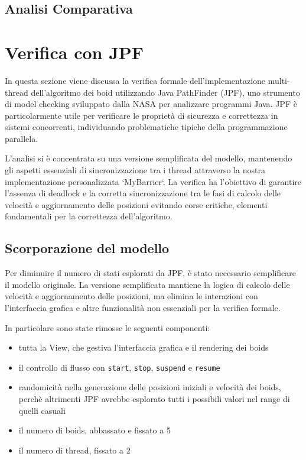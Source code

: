 \documentclass[a4paper,12pt]{report}
\begin{document}
\section{Analisi Comparativa}


\chapter{Verifica con JPF}
In questa sezione viene discussa la verifica formale dell'implementazione multi-thread dell'algoritmo dei boid utilizzando Java PathFinder (JPF), uno strumento di model checking sviluppato dalla NASA per analizzare programmi Java. 
JPF è particolarmente utile per verificare le proprietà di sicurezza e correttezza in sistemi concorrenti, individuando problematiche tipiche della programmazione parallela.

L'analisi si è concentrata su una versione semplificata del modello, mantenendo gli aspetti essenziali di sincronizzazione tra i thread attraverso la nostra implementazione personalizzata `MyBarrier`. La verifica ha l'obiettivo di garantire l'assenza di deadlock e la corretta sincronizzazione tra le fasi di calcolo delle velocità e aggiornamento delle posizioni evitando corse critiche, elementi fondamentali per la correttezza dell'algoritmo.

\section{Scorporazione del modello}
Per diminuire il numero di stati esplorati da JPF, è stato necessario semplificare il modello originale. La versione semplificata mantiene la logica di calcolo delle velocità e aggiornamento delle posizioni, ma elimina le interazioni con l'interfaccia grafica e altre funzionalità non essenziali per la verifica formale.

In particolare sono state rimosse le seguenti componenti:
\begin{itemize}
    \item tutta la View, che gestiva l'interfaccia grafica e il rendering dei boids
    \item il controllo di flusso con \texttt{start}, \texttt{stop}, \texttt{suspend} e \texttt{resume} 
    \item randomicità nella generazione delle posizioni iniziali e velocità dei boids, perchè altrimenti JPF avrebbe esplorato tutti i possibili valori nel range di quelli casuali
    \item il numero di boids, abbassato e fissato a 5
    \item il numero di thread, fissato a 2
\end{itemize}
\end{document}
